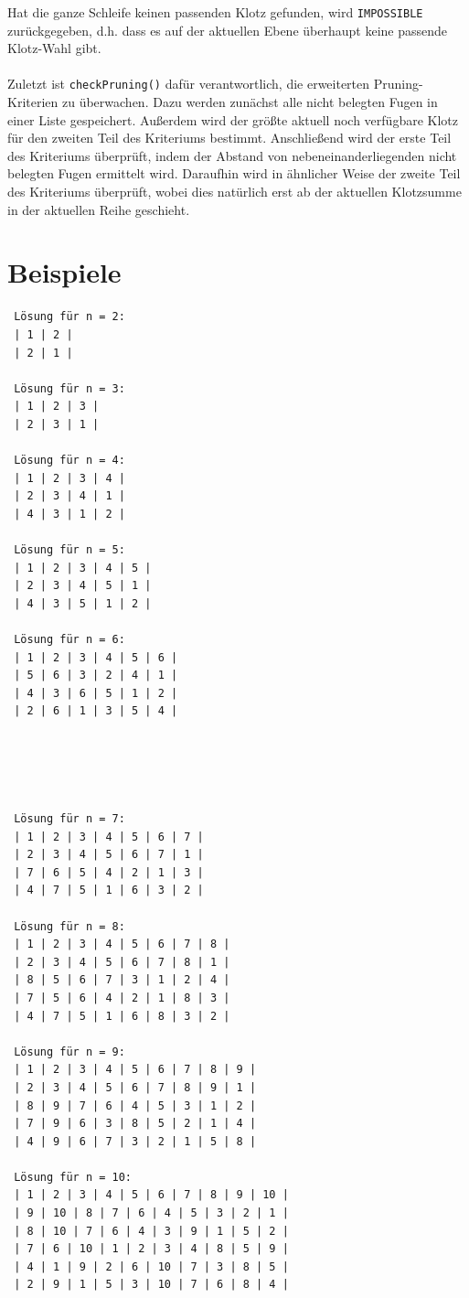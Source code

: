 \documentclass[a4paper, notitlepage, 12pt]{scrartcl}
\begin{document}
Hat die ganze Schleife keinen passenden Klotz gefunden, wird \texttt{IMPOSSIBLE} zurückgegeben, d.h. dass es auf der aktuellen Ebene überhaupt keine passende Klotz-Wahl gibt.
\\ \\
Zuletzt ist \texttt{checkPruning()} dafür verantwortlich, die erweiterten Pruning-Kriterien zu überwachen. Dazu werden zunächst alle nicht belegten Fugen in einer Liste gespeichert. Außerdem wird der größte aktuell noch verfügbare Klotz für den zweiten Teil des Kriteriums bestimmt. Anschließend wird der erste Teil des Kriteriums überprüft, indem der Abstand von nebeneinanderliegenden nicht belegten Fugen ermittelt wird. Daraufhin wird in ähnlicher Weise der zweite Teil des Kriteriums überprüft, wobei dies natürlich erst ab der aktuellen Klotzsumme in der aktuellen Reihe geschieht.
\newpage
\section{Beispiele}
 \begin{multicols}{2}
 \begin{verbatim}
 Lösung für n = 2: 
 | 1 | 2 | 
 | 2 | 1 |
 
 Lösung für n = 3:
 | 1 | 2 | 3 | 
 | 2 | 3 | 1 |
 
 Lösung für n = 4: 
 | 1 | 2 | 3 | 4 | 
 | 2 | 3 | 4 | 1 | 
 | 4 | 3 | 1 | 2 |
 
 Lösung für n = 5: 
 | 1 | 2 | 3 | 4 | 5 | 
 | 2 | 3 | 4 | 5 | 1 | 
 | 4 | 3 | 5 | 1 | 2 |
 
 Lösung für n = 6: 
 | 1 | 2 | 3 | 4 | 5 | 6 | 
 | 5 | 6 | 3 | 2 | 4 | 1 | 
 | 4 | 3 | 6 | 5 | 1 | 2 | 
 | 2 | 6 | 1 | 3 | 5 | 4 |
 
 
 
 
 
 Lösung für n = 7:
 | 1 | 2 | 3 | 4 | 5 | 6 | 7 | 
 | 2 | 3 | 4 | 5 | 6 | 7 | 1 | 
 | 7 | 6 | 5 | 4 | 2 | 1 | 3 | 
 | 4 | 7 | 5 | 1 | 6 | 3 | 2 | 
 
 Lösung für n = 8:
 | 1 | 2 | 3 | 4 | 5 | 6 | 7 | 8 | 
 | 2 | 3 | 4 | 5 | 6 | 7 | 8 | 1 | 
 | 8 | 5 | 6 | 7 | 3 | 1 | 2 | 4 | 
 | 7 | 5 | 6 | 4 | 2 | 1 | 8 | 3 | 
 | 4 | 7 | 5 | 1 | 6 | 8 | 3 | 2 | 
 
 Lösung für n = 9:
 | 1 | 2 | 3 | 4 | 5 | 6 | 7 | 8 | 9 | 
 | 2 | 3 | 4 | 5 | 6 | 7 | 8 | 9 | 1 | 
 | 8 | 9 | 7 | 6 | 4 | 5 | 3 | 1 | 2 | 
 | 7 | 9 | 6 | 3 | 8 | 5 | 2 | 1 | 4 | 
 | 4 | 9 | 6 | 7 | 3 | 2 | 1 | 5 | 8 | 
 
 Lösung für n = 10:
 | 1 | 2 | 3 | 4 | 5 | 6 | 7 | 8 | 9 | 10 | 
 | 9 | 10 | 8 | 7 | 6 | 4 | 5 | 3 | 2 | 1 | 
 | 8 | 10 | 7 | 6 | 4 | 3 | 9 | 1 | 5 | 2 | 
 | 7 | 6 | 10 | 1 | 2 | 3 | 4 | 8 | 5 | 9 | 
 | 4 | 1 | 9 | 2 | 6 | 10 | 7 | 3 | 8 | 5 | 
 | 2 | 9 | 1 | 5 | 3 | 10 | 7 | 6 | 8 | 4 | 
 \end{verbatim}
 \end{multicols}
\end{document}
